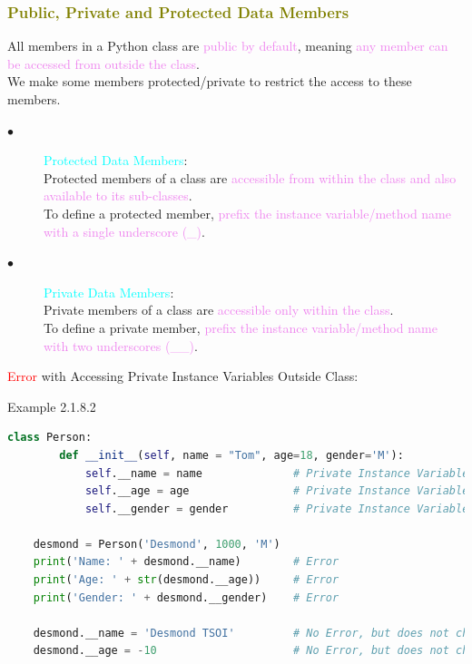 \documentclass{book}
\begin{document}
    \textcolor{olive}{\subsubsection{Public, Private and Protected Data Members}}
    \raggedright All members in a Python class are \textcolor{violet}{public by default}, meaning \textcolor{violet}{any member can be accessed from outside the class}.\\
    We make some members protected/private to restrict the access to these members.\\
    \begin{description}
        \item[$\bullet$] \textcolor{cyan}{Protected Data Members}:\\
        Protected members of a class are \textcolor{violet}{accessible from within the class and also available to its sub-classes}.\\
        To define a protected member, \textcolor{violet}{prefix the instance variable/method name with a single underscore (\_)}.
        \item[$\bullet$] \textcolor{cyan}{Private Data Members}:\\
        Private members of a class are \textcolor{violet}{accessible only within the class}.\\
        To define a private member, \textcolor{violet}{prefix the instance variable/method name with two underscores (\_\_)}.
    \end{description}
    \textcolor{red}{Error} with Accessing Private Instance Variables Outside Class:
    \begin{egBox}[]{Example 2.1.8.2}{}
    \begin{lstlisting}[language=Python, basicstyle=\ttfamily\small, keywordstyle=\color{blue}, commentstyle=\color{forestgreen}, stringstyle=\color{red}, showstringspaces=false]
    class Person:
        def __init__(self, name = "Tom", age=18, gender='M'):
            self.__name = name              # Private Instance Variable __name
            self.__age = age                # Private Instance Variable __age
            self.__gender = gender          # Private Instance Variable __gender
    
    desmond = Person('Desmond', 1000, 'M')
    print('Name: ' + desmond.__name)        # Error
    print('Age: ' + str(desmond.__age))     # Error
    print('Gender: ' + desmond.__gender)    # Error

    desmond.__name = 'Desmond TSOI'         # No Error, but does not change desmond.__name.
    desmond.__age = -10                     # No Error, but does not change desmond.__age.
    \end{lstlisting}
    \end{egBox}
\end{document}
